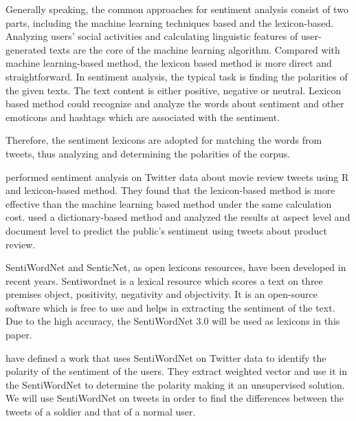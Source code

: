 Generally speaking, the common approaches for sentiment analysis consist of two parts, including the machine learning techniques based and the lexicon-based. Analyzing users’ social activities and calculating linguistic features of user-generated texts are the core of the machine learning algorithm. Compared with machine learning-based method, the lexicon based method is more direct and straightforward. In sentiment analysis, the typical task is finding the polarities of the given texts. The text content is either positive, negative or neutral. Lexicon based method could recognize and analyze the words about sentiment and other emoticons and hashtags which are associated with the sentiment.

Therefore, the sentiment lexicons are adopted for matching the words from tweets, thus analyzing and determining the polarities of the corpus.

\cite{azizan2019lexicon} performed sentiment analysis on Twitter data about movie review tweets using R and lexicon-based method. They found that the lexicon-based method is more effective than the machine learning based method under the same calculation cost. \cite{8073512} used a dictionary-based method and analyzed the results at aspect level and document level to predict the public’s sentiment using tweets about product review.

SentiWordNet and SenticNet, as open lexicons resources, have been developed in recent years. Sentiwordnet is a lexical resource which scores a text on three premises object, positivity, negativity and objectivity. It is an open-source software which is free to use and helps in extracting the sentiment of the text. Due to the high accuracy, the SentiWordNet 3.0 \citep{baccianella2010sentiwordnet} will be used as lexicons in this paper.

\cite{montejo2012random} have defined a work that uses SentiWordNet on Twitter data to identify the polarity of the sentiment of the users. They extract weighted vector and use it in the SentiWordNet to determine the polarity making it an unsupervised solution. We will use SentiWordNet on tweets in order to find the differences between the tweets of a soldier and that of a normal user.
